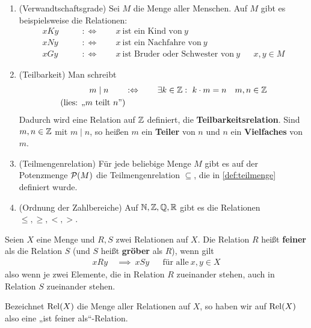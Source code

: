 \begin{bsp} \quad {} 
    \begin{enumerate}
        \item(Verwandtschaftsgrade) Sei $M$ die Menge aller Menschen. Auf $M$ gibt es beispielsweise die Relationen:
        \begin{align*}
            xKy \qquad&:\Leftrightarrow\qquad x\ \text{ist ein Kind von}\ y && \\
            xNy \qquad&:\Leftrightarrow\qquad x\ \text{ist ein Nachfahre von}\ y && \\
            xGy \qquad&:\Leftrightarrow\qquad x\ \text{ist Bruder oder Schwester von}\ y && x,y\in M
        \end{align*}
        \item(Teilbarkeit) Man schreibt
        \begin{align*}
            m \mid n \qquad& :\Leftrightarrow\qquad \exists k\in \mathbb Z:\ k\cdot m=n && m,n\in \mathbb Z \\
            (\text{lies: „$m$ teilt $n$”})
        \end{align*}
        Dadurch wird eine Relation auf $\mathbb Z$ definiert, die \textbf{Teilbarkeitsrelation}. Sind $m,n\in \mathbb Z$ mit $m\mid n$, so heißen $m$ ein \textbf{Teiler} von $n$ und $n$ ein \textbf{Vielfaches} von $m$.
        \item(Teilmengenrelation) Für jede beliebige Menge $M$ gibt es auf der Potenzmenge $\mathcal P(M)$ die Teilmengenrelation $\subseteq$, die in \cref{def:teilmenge} definiert wurde.
        \item(Ordnung der Zahlbereiche) Auf $\mathbb N,\mathbb Z,\mathbb Q,\mathbb R$ gibt es die Relationen $\le, \ge, <, >$.
    \end{enumerate}
\end{bsp}


\begin{defin}  
    Seien $X$ eine Menge und $R,S$ zwei Relationen auf $X$. Die Relation $R$ heißt \textbf{feiner} als die Relation $S$ (und $S$ heißt \textbf{gröber} als $R$), wenn gilt
    \begin{align*}
        xRy \ &\implies\ xSy && \text{für alle}\ x,y\in X
    \end{align*}
    also wenn je zwei Elemente, die in Relation $R$ zueinander stehen, auch in Relation $S$ zueinander stehen.

    Bezeichnet $\operatorname{Rel}(X)$ die Menge aller Relationen auf $X$, so haben wir auf $\operatorname{Rel}(X)$ also eine „ist feiner als“-Relation.
\end{defin}


